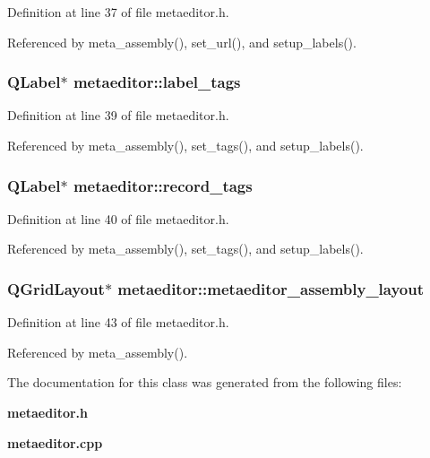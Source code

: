 Definition at line 37 of file metaeditor.h.

Referenced by meta\_\-assembly(), set\_\-url(), and setup\_\-labels().
\subsubsection{\setlength{\rightskip}{0pt plus 5cm}QLabel$\ast$ {\bf metaeditor::label\_\-tags}\hspace{0.3cm}{\tt  [private]}}\label{classmetaeditor_fecc1bce78195af18c044cb9247abccd}




Definition at line 39 of file metaeditor.h.

Referenced by meta\_\-assembly(), set\_\-tags(), and setup\_\-labels().
\subsubsection{\setlength{\rightskip}{0pt plus 5cm}QLabel$\ast$ {\bf metaeditor::record\_\-tags}\hspace{0.3cm}{\tt  [private]}}\label{classmetaeditor_4a9efaccbe710bcb154149c393f680f2}




Definition at line 40 of file metaeditor.h.

Referenced by meta\_\-assembly(), set\_\-tags(), and setup\_\-labels().
\subsubsection{\setlength{\rightskip}{0pt plus 5cm}QGrid\-Layout$\ast$ {\bf metaeditor::metaeditor\_\-assembly\_\-layout}\hspace{0.3cm}{\tt  [private]}}\label{classmetaeditor_10114b661c3f4fcb052b059962dd0f10}




Definition at line 43 of file metaeditor.h.

Referenced by meta\_\-assembly().

The documentation for this class was generated from the following files:\begin{CompactItemize}
\item 
{\bf metaeditor.h}\item 
{\bf metaeditor.cpp}\end{CompactItemize}
